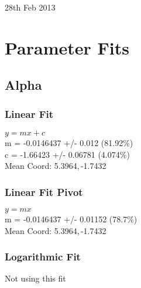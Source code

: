 \documentclass{article}
\begin{document}
\small{28th Feb 2013}
\section{Parameter Fits}
	\subsection{Alpha}
		\subsubsection{Linear Fit}
			\begin{minipage}[h]{0.6\textwidth}
					\begin{center}
						\begingroup{}
			  			\resizebox{\textwidth}{!}{%
							
			  			}\endgroup
					\end{center}
			\end{minipage}
			\begin{minipage}[h]{0.35\textwidth}
				$y = mx + c$ \\
				m               = -0.0146437       +/- 0.012        (81.92\%) \\
				c               = -1.66423         +/- 0.06781      (4.074\%) \\

				Mean Coord: 5.3964,\,-1.7432
			\end{minipage}			

		\subsubsection{Linear Fit Pivot}
			\begin{minipage}[h]{0.6\textwidth}
					\begin{center}
						\begingroup{}
			  			\resizebox{\textwidth}{!}{%
							
			  			}\endgroup
					\end{center}
			\end{minipage}
			\begin{minipage}[h]{0.35\textwidth}
				$y = mx$ \\
				m               = -0.0146437       +/- 0.01152      (78.7\%) \\

				Mean Coord: 5.3964,\,-1.7432
			\end{minipage}

		\subsubsection{Logarithmic Fit}
			\begin{minipage}[h]{0.6\textwidth}
					\begin{center}
						\begingroup{}
			  			\resizebox{\textwidth}{!}{%
							
			  			}\endgroup
					\end{center}
			\end{minipage}
			\begin{minipage}[h]{0.35\textwidth}
				Not using this fit
			\end{minipage}
\end{document}
